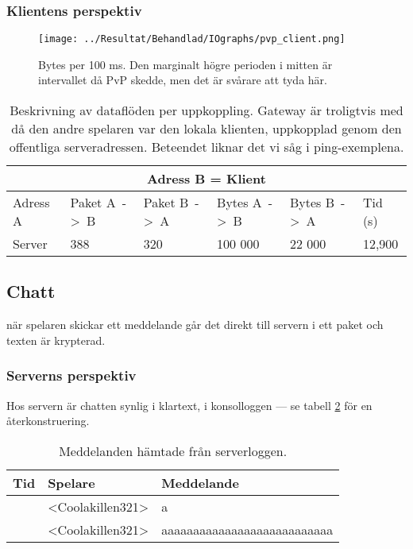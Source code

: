 \documentclass[journal,comsoc]{IEEEtran}
\begin{document}
\subsubsection{Klientens perspektiv}
\begin{figure} [H]
  \centering
  \texttt{[image: ../Resultat/Behandlad/IOgraphs/pvp\_client.png]}
  \caption{Bytes per 100 ms. Den marginalt högre perioden i mitten är intervallet då PvP skedde, men det är svårare att tyda här.}
  \label{fig:client:pvp}
\end{figure}
\begin{table} [H]
  \begin{center}
    \label{table:client:pvp}
    \begin{tabular}{ | m{1.5cm} |  m{1cm} | m{1cm}| m{1cm}|m{1cm}|m{0.75cm}| } 
      \hline
      \multicolumn{6}{|c|}{Adress B = Klient} \\
      \hline
      Adress A & Paket A~->~B & Paket B~->~A & Bytes A~->~B & Bytes B~->~A & Tid (s) \\
      \hline
      Server & 388 & 320 & 100 000 & 22 000 & 12,900 \\ 
      \hline 
    \end{tabular}
  \end{center}
  \caption{Beskrivning av dataflöden per uppkoppling. Gateway är troligtvis med då den andre spelaren var den lokala klienten, uppkopplad genom den offentliga serveradressen. Beteendet liknar det vi såg i ping-exemplena.}
\end{table}
\subsection{Chatt}
när spelaren skickar ett meddelande går det direkt till servern i ett paket och texten är krypterad.
\label{test:chat}
\subsubsection{Serverns perspektiv}
Hos servern är chatten synlig i klartext, i konsolloggen --- se tabell \ref{table:server:mcchatlog} för en återkonstruering.
\begin{table} [H]
  \begin{center}
    \label{table:server:mcchatlog}
    \begin{tabular}{ | m{1cm} | m{2cm}| m{3.5cm}| } 
      \hline
      Tid & Spelare & Meddelande \\
      \hline
      [19:14:21] & <Coolakillen321> & a \\
      \hline 
      [19:14:24] & <Coolakillen321> & aaaaaaaaaaaaaaaaaaaaaaaaaaa \\
      \hline 
    \end{tabular}
  \end{center}
  \caption{Meddelanden hämtade från serverloggen.}
\end{table}
\end{document}
